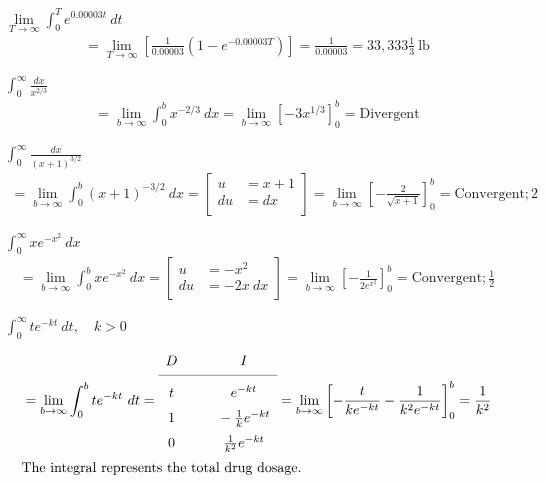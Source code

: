 \documentclass[12pt]{article}
\newenvironment{problem}[2][]{
    \begin{trivlist}
        \item[
            {\bfseries #1}
            {\bfseries #2.}
        ]
}{\end{trivlist}}
\newcommand{\subu}[2]{
\left[
\begin{alignedat}{1}
u &= #1 \\
du &= #2 \\
\end{alignedat}
\right] 
}
\newcommand{\tikzmark}[1]{%
    \tikz[overlay, remember picture, baseline] \node (#1) {};%
}
\begin{document}
\begin{problem}{39}
$\underset{T \to \infty}{\lim} \displaystyle\int_0^T e^{0.00003t} ~ dt$
\begin{align}
= \underset{T \to \infty}{\lim} \left[\frac{1}{0.00003} \left(1 - e^{-0.00003T}\right)\right] = \frac{1}{0.00003} = 33,333 \frac{1}{3} ~ \text{lb}
\end{align}
\end{problem}

\begin{problem}{43}
$\displaystyle\int_0^\infty \frac{dx}{x^{2/3}}$
\begin{align}
= \underset{b \to \infty}{\lim} \int_0^b x^{-2/3} ~ dx = \underset{b \to \infty}{\lim} \left[-3x^{1/3}\right]_0^b = \text{Divergent}
\end{align}
\end{problem}

\begin{problem}{45}
$\displaystyle\int_0^\infty \frac{dx}{\left(x + 1\right)^{3/2}}$
\begin{align}
= \underset{b \to \infty}{\lim} \int_0^b \left(x + 1\right)^{-3/2} ~ dx = \subu{x + 1}{dx} = \underset{b \to \infty}{\lim} \left[- \frac{2}{\sqrt{x + 1}}\right]_0^b = \text{Convergent}; 2
\end{align}
\end{problem}

\begin{problem}{47}
$\displaystyle\int_0^\infty xe^{-x^2} ~ dx$
\begin{align}
= \underset{b \to \infty}{\lim} \int_0^b xe^{-x^2} ~ dx = \subu{-x^2}{-2x ~ dx} = \underset{b \to \infty}{\lim} \left[- \frac{1}{2e^{x^2}}\right]_0^b = \text{Convergent}; \frac{1}{2}
\end{align}
\end{problem}

\begin{problem}{49}
$\displaystyle\int_0^\infty te^{-kt} ~ dt, \quad k > 0$
\begin{align}
&= \underset{b \to \infty}{\lim} \int_0^b te^{-kt} ~ dt = 
\renewcommand{\arraystretch}{1.5}
\begin{array}{c @{\hspace*{1.0cm}} c}
D & I \\
\cmidrule{1-2}
t \tikzmark{D1} & \tikzmark{I1}e^{-kt} \\
1 \tikzmark{D2} & \tikzmark{I2}-\frac{1}{k} e^{-kt} \\
0 \tikzmark{D3} & \tikzmark{I3}\frac{1}{k^2} e^{-kt}
\end{array} = \underset{b \to \infty}{\lim} \left[-\frac{t}{ke^{-kt}} - \frac{1}{k^2 e^{-kt}}\right]_0^b = \frac{1}{k^2} \\
&\text{The integral represents the total drug dosage.}
\end{align}
\end{problem}
\end{document}
